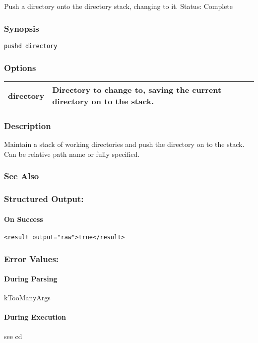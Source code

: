 \subsection{}
\label{pushd}
Push a directory onto the directory stack, changing to it. 
 Status: Complete
\subsubsection*{Synopsis}
\begin{verbatim}
pushd directory
\end{verbatim}
\subsubsection*{Options}
\begin{tabular}{|l|l|}
\hline 
 directory  & Directory to change to, saving the current directory on to the stack.  \\
 \hline 
\end{tabular}
\subsubsection*{Description}
 Maintain a stack of working directories and push the directory on to the stack. Can be relative path name or fully specified. 
\subsubsection*{See Also}
\subsubsection*{Structured Output:}
\paragraph*{On Success}
\begin{verbatim}
<result output="raw">true</result>
\end{verbatim}
\subsubsection*{Error Values:}
\paragraph*{During Parsing}
 kTooManyArgs
\paragraph*{During Execution}
 see cd
